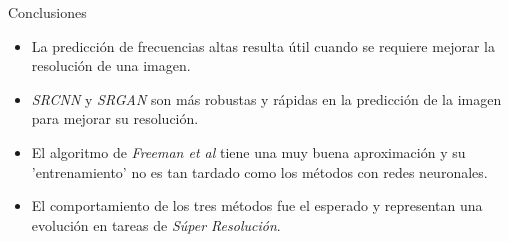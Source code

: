 \begin{frame}{Conclusiones}
    \begin{block}{}
        \begin{itemize}
            \item La predicción de frecuencias altas resulta útil cuando se 
            requiere mejorar la resolución de una imagen.
            \pause
            \item \emph{SRCNN} y \emph{SRGAN} son más robustas y rápidas en la predicción 
            de la imagen para mejorar su resolución. 
            \pause
            \item El algoritmo de \emph{Freeman et al} tiene una muy buena aproximación
            y su 'entrenamiento' no es tan tardado como los métodos con redes neuronales. 
            \pause
            \item El comportamiento de los tres métodos fue el esperado y representan
            una evolución en tareas de \emph{Súper Resolución}. 
        \end{itemize}
    \end{block}
\end{frame}